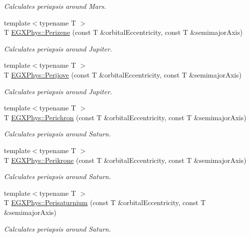 \begin{DoxyCompactItemize}
\begin{DoxyCompactList}\small\item\em Calculates periapsis around Mars. \end{DoxyCompactList}\item 
{\footnotesize template$<$typename T $>$ }\\T \hyperlink{group___e_g_x_phys-_periapsis_ga0523c65b7fc26e675388b2c3d38aa00b}{E\+G\+X\+Phys\+::\+Perizene} (const T \&orbital\+Eccentricity, const T \&semimajor\+Axis)
\begin{DoxyCompactList}\small\item\em Calculates periapsis around Jupiter. \end{DoxyCompactList}\item 
{\footnotesize template$<$typename T $>$ }\\T \hyperlink{group___e_g_x_phys-_periapsis_ga075052f7ff9aa1d5fdf4501b493be86b}{E\+G\+X\+Phys\+::\+Perijove} (const T \&orbital\+Eccentricity, const T \&semimajor\+Axis)
\begin{DoxyCompactList}\small\item\em Calculates periapsis around Jupiter. \end{DoxyCompactList}\item 
{\footnotesize template$<$typename T $>$ }\\T \hyperlink{group___e_g_x_phys-_periapsis_ga12b5e99aa2e3e7031ef6ce93060cf516}{E\+G\+X\+Phys\+::\+Perichron} (const T \&orbital\+Eccentricity, const T \&semimajor\+Axis)
\begin{DoxyCompactList}\small\item\em Calculates periapsis around Saturn. \end{DoxyCompactList}\item 
{\footnotesize template$<$typename T $>$ }\\T \hyperlink{group___e_g_x_phys-_periapsis_gaa56f74c44a3583b8f0d13b821c1d7422}{E\+G\+X\+Phys\+::\+Perikrone} (const T \&orbital\+Eccentricity, const T \&semimajor\+Axis)
\begin{DoxyCompactList}\small\item\em Calculates periapsis around Saturn. \end{DoxyCompactList}\item 
{\footnotesize template$<$typename T $>$ }\\T \hyperlink{group___e_g_x_phys-_periapsis_ga60a50d09d29ebe47cbbfc125c2ea42bf}{E\+G\+X\+Phys\+::\+Perisaturnium} (const T \&orbital\+Eccentricity, const T \&semimajor\+Axis)
\begin{DoxyCompactList}\small\item\em Calculates periapsis around Saturn. \end{DoxyCompactList}\item 

\end{DoxyCompactItemize}
